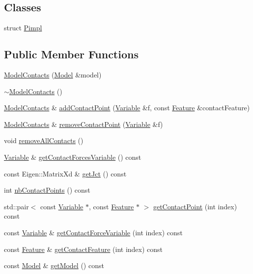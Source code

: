 \subsection*{Classes}
\begin{DoxyCompactItemize}
\item 
struct \hyperlink{structocra_1_1ModelContacts_1_1Pimpl}{Pimpl}
\end{DoxyCompactItemize}
\subsection*{Public Member Functions}
\begin{DoxyCompactItemize}
\item 
\hyperlink{classocra_1_1ModelContacts_abf9089d7762205480b46005544883e60}{Model\+Contacts} (\hyperlink{classocra_1_1Model}{Model} \&model)
\item 
\hyperlink{classocra_1_1ModelContacts_ab8ca6e653ccacdff73ae10e7c0750bbf}{$\sim$\+Model\+Contacts} ()
\item 
\hyperlink{classocra_1_1ModelContacts}{Model\+Contacts} \& \hyperlink{classocra_1_1ModelContacts_a209ae06f99698291a84e043fa7b8e32e}{add\+Contact\+Point} (\hyperlink{classocra_1_1Variable}{Variable} \&f, const \hyperlink{classocra_1_1Feature}{Feature} \&contact\+Feature)
\item 
\hyperlink{classocra_1_1ModelContacts}{Model\+Contacts} \& \hyperlink{classocra_1_1ModelContacts_a4e2267a563e01c78c9aff1fced5cb83b}{remove\+Contact\+Point} (\hyperlink{classocra_1_1Variable}{Variable} \&f)
\item 
void \hyperlink{classocra_1_1ModelContacts_ad633a3df5915ee16b3a55b8169e4006e}{remove\+All\+Contacts} ()
\item 
\hyperlink{classocra_1_1Variable}{Variable} \& \hyperlink{classocra_1_1ModelContacts_a6668bfd6c112b849536b701cd2d1097c}{get\+Contact\+Forces\+Variable} () const
\item 
const Eigen\+::\+Matrix\+Xd \& \hyperlink{classocra_1_1ModelContacts_ac3c23337fdfac47ddf40b7e3332e31fc}{get\+Jct} () const
\item 
int \hyperlink{classocra_1_1ModelContacts_ab06a70136062c53c28344ce471f0bd73}{nb\+Contact\+Points} () const
\item 
std\+::pair$<$ const \hyperlink{classocra_1_1Variable}{Variable} $\ast$, const \hyperlink{classocra_1_1Feature}{Feature} $\ast$ $>$ \hyperlink{classocra_1_1ModelContacts_a6fde5f06051fafaebd07a1ebb80bd82c}{get\+Contact\+Point} (int index) const
\item 
const \hyperlink{classocra_1_1Variable}{Variable} \& \hyperlink{classocra_1_1ModelContacts_aede709082b66b0c30aa57ac4cd7094ad}{get\+Contact\+Force\+Variable} (int index) const
\item 
const \hyperlink{classocra_1_1Feature}{Feature} \& \hyperlink{classocra_1_1ModelContacts_a40f66a2528a3f7c0538172987de7c919}{get\+Contact\+Feature} (int index) const
\item 
const \hyperlink{classocra_1_1Model}{Model} \& \hyperlink{classocra_1_1ModelContacts_a188e822de7692fba999836b1ffb7f376}{get\+Model} () const
\end{DoxyCompactItemize}
